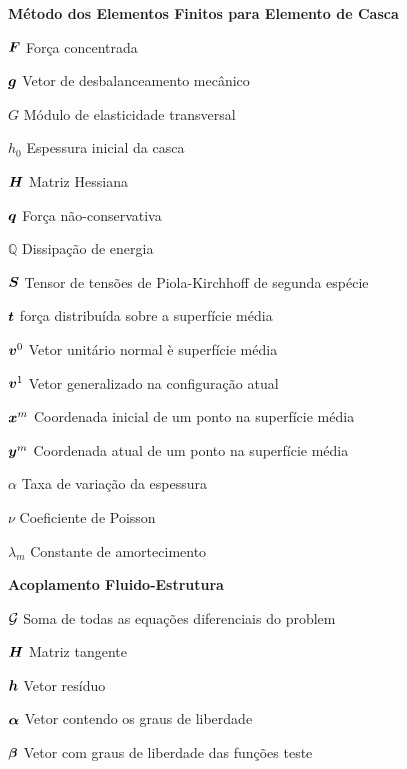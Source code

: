 \begin{simbolos}
    \item[\textbf{Método dos Elementos Finitos para Elemento de Casca}]
    \item[$\boldsymbol{F}$] Força concentrada
    \item[$\boldsymbol{g}$] Vetor de desbalanceamento mecânico
    \item[$G$] Módulo de elasticidade transversal
    \item[$h_0$] Espessura inicial da casca
    \item[$\boldsymbol{H}$] Matriz Hessiana
    \item[$\boldsymbol{q}$] Força não-conservativa
    \item[$\mathbb{Q}$] Dissipação de energia
    \item[$\boldsymbol{S}$] Tensor de tensões de Piola-Kirchhoff de segunda espécie
    \item[$\boldsymbol{t}$] força distribuída sobre a superfície média
    \item[$\boldsymbol{v}^0$] Vetor unitário normal è superfície média
    \item[$\boldsymbol{v}^1$] Vetor generalizado na configuração atual
    \item[$\boldsymbol{x}^m$] Coordenada inicial de um ponto na superfície média
    \item[$\boldsymbol{y}^m$] Coordenada atual de um ponto na superfície média
    \item[$\alpha$] Taxa de variação da espessura
    \item[$\nu$] Coeficiente de Poisson
    \item[$\lambda_m$] Constante de amortecimento

    \item[\textbf{Acoplamento Fluido-Estrutura}]
    \item[$\mathcal{G}$] Soma de todas as equações diferenciais do problem
    \item[$\boldsymbol{H}$] Matriz tangente
    \item[$\boldsymbol{h}$] Vetor resíduo
    \item[$\boldsymbol{\alpha}$] Vetor contendo os graus de liberdade
    \item[$\boldsymbol{\beta}$] Vetor com graus de liberdade das funções teste


\end{simbolos}
